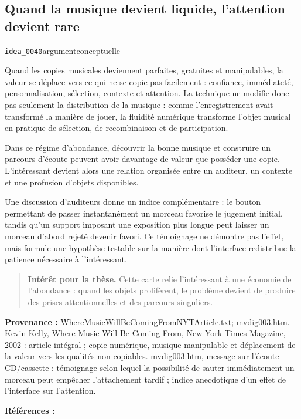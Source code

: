 \documentclass[10pt,a4paper]{article}
\begin{document}
\subsection{Quand la musique devient liquide, l'attention devient rare}
{\small\color{metadata} \texttt{idea\_0040}\quad\textbullet\quad argument\quad\textbullet\quad conceptuelle\par}

Quand les copies musicales deviennent parfaites, gratuites et manipulables, la valeur se déplace vers ce qui ne se copie pas facilement : confiance, immédiateté, personnalisation, sélection, contexte et attention. La technique ne modifie donc pas seulement la distribution de la musique : comme l'enregistrement avait transformé la manière de jouer, la fluidité numérique transforme l'objet musical en pratique de sélection, de recombinaison et de participation.

Dans ce régime d'abondance, découvrir la bonne musique et construire un parcours d'écoute peuvent avoir davantage de valeur que posséder une copie. L'intéressant devient alors une relation organisée entre un auditeur, un contexte et une profusion d'objets disponibles.

Une discussion d'auditeurs donne un indice complémentaire : le bouton permettant de passer instantanément un morceau favorise le jugement initial, tandis qu'un support imposant une exposition plus longue peut laisser un morceau d'abord rejeté devenir favori. Ce témoignage ne démontre pas l'effet, mais formule une hypothèse testable sur la manière dont l'interface redistribue la patience nécessaire à l'intéressant.

\begin{quote}
\textbf{Intérêt pour la thèse.} Cette carte relie l'intéressant à une économie de l'abondance : quand les objets prolifèrent, le problème devient de produire des prises attentionnelles et des parcours singuliers.
\end{quote}
{\footnotesize\color{metadata}\textbf{Provenance :} WhereMusicWillBeComingFromNYTArticle.txt; mvdig003.htm. Kevin Kelly, Where Music Will Be Coming From, New York Times Magazine, 2002 : article intégral ; copie numérique, musique manipulable et déplacement de la valeur vers les qualités non copiables. mvdig003.htm, message sur l'écoute CD/cassette : témoignage selon lequel la possibilité de sauter immédiatement un morceau peut empêcher l'attachement tardif ; indice anecdotique d'un effet de l'interface sur l'attention.\par}
{\footnotesize\color{metadata}\textbf{Références :} \parencite{kelly2002music}\par}
\end{document}
